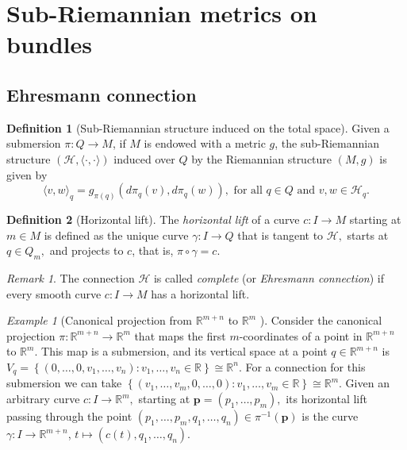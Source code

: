 \documentclass [xcolor=svgnames, t] {beamer}
\theoremstyle{definition}
\newtheorem{df}{Definition}
\theoremstyle{plain}
\theoremstyle{remark}
\newtheorem{ex}{Example}
\newtheorem{rem}{Remark}
\begin{document}
\section{Sub-Riemannian metrics on bundles}
\subsection{Ehresmann connection}%
\label{sub:ehresmann_connection}

\begin{frame}[allowframebreaks]
	\begin{df}[Sub-Riemannian structure induced on the total space]
	Given a submersion $ \pi: Q \rightarrow M $, if $ M $ is endowed with a metric $ g $, the sub-Riemannian structure $ (\mathcal{H},\langle \cdot, \cdot\rangle) $ induced over $ Q $  by the Riemannian structure $ (M,g) $ is given by
$$ \langle v,w \rangle_q = g_{\pi(q)} \left( d\pi_q(v), d\pi_q(w) \right), \text{ for all }q\in Q \text{ and } v,w\in \mathcal{H}_q.   $$ 
	\end{df}
	\begin{df}[Horizontal lift]
	The \textit{horizontal lift} of a curve $ c: I \rightarrow {M} $ starting at $ m\in M $ is defined as the unique curve $ \gamma : I \rightarrow {Q} $ that is tangent to $ \mathcal{H}, $ starts at $ q\in Q_m, $ and projects to $c$, that is, $ \pi\circ\gamma = c. $ 
	\end{df}
\begin{rem}
	The connection $ \mathcal{H} $ is called \textit{complete} (or \textit{Ehresmann connection})  if every smooth curve $ c: I \rightarrow {M} $ has a horizontal lift.
\end{rem}
\begin{ex}[Canonical projection from $ \mathbb{R}^{m+n} $ to $ \mathbb{R}^m $  ]\label{ex:can_proj}
	\sloppy	Consider the canonical projection $ \pi: \mathbb{R}^{m+n} \rightarrow \mathbb{R}^m $ that maps the first $ m $-coordinates of a point in $ \mathbb{R}^{m+n} $  to $ \mathbb{R}^m. $ This map is a submersion, and its vertical space at a point $ q\in \mathbb{R}^{m+n} $ is $ V_q = \left\{ (0,\dots,0,v_1,\dots,v_n) : v_1,\dots,v_n\in \mathbb{R}  \right\} \cong \mathbb{R}^n. $ For a connection for this submersion we can take $ \left\{ (v_1,\dots,v_m, 0,\dots, 0): v_1,\dots,v_m\in \mathbb{R} \right\}\cong \mathbb{R}^m.  $ Given an arbitrary curve $ c: I \rightarrow \mathbb{R}^m, $ starting at $ \boldsymbol{p}= (p_1,\dots,p_m), $ its horizontal lift passing through the point $ (p_1,\dots,p_m,q_1,\dots,q_n)\in \pi^{-1}( \boldsymbol{p} ) $ is the curve $ \gamma: I \rightarrow \mathbb{R}^{m+n} $, $ t\mapsto (c(t),q_1,\dots,q_n). $   

\end{ex}
\end{frame}
\end{document}
